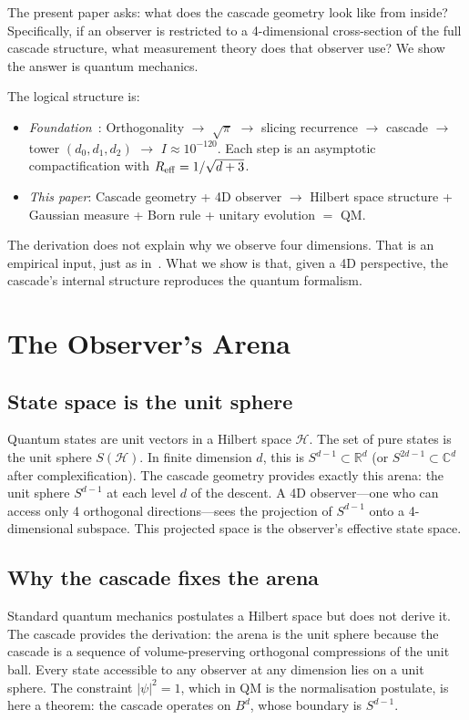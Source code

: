 \documentclass[12pt,a4paper]{article}
\begin{document}
The present paper asks: what does the cascade geometry look like from inside? Specifically,
if an observer is restricted to a 4-dimensional cross-section of the full cascade structure,
what measurement theory does that observer use? We show the answer is quantum mechanics.

The logical structure is:
\begin{itemize}
\item \emph{Foundation~\cite{paperI}}: Orthogonality $\to$ $\sqrt{\pi}$ $\to$ slicing
recurrence $\to$ cascade $\to$ tower $(d_0,d_1,d_2)$ $\to$ $I\approx 10^{-120}$. Each step
is an asymptotic compactification with $R_{\rm eff}=1/\sqrt{d+3}$.
\item \emph{This paper}: Cascade geometry + 4D observer $\to$ Hilbert space structure +
Gaussian measure + Born rule + unitary evolution $=$ QM.
\end{itemize}

The derivation does not explain why we observe four dimensions. That is an empirical input,
just as in~\cite{paperI}. What we show is that, given a 4D perspective, the cascade's
internal structure reproduces the quantum formalism.

\section{The Observer's Arena}

\subsection{State space is the unit sphere}

Quantum states are unit vectors in a Hilbert space $\mathcal{H}$. The set of pure states is
the unit sphere $S(\mathcal{H})$. In finite dimension $d$, this is $S^{d-1}\subset\mathbb{R}^d$
(or $S^{2d-1}\subset\mathbb{C}^d$ after complexification). The cascade geometry provides
exactly this arena: the unit sphere $S^{d-1}$ at each level $d$ of the descent. A 4D
observer---one who can access only 4 orthogonal directions---sees the projection of
$S^{d-1}$ onto a 4-dimensional subspace. This projected space is the observer's effective
state space.

\subsection{Why the cascade fixes the arena}

Standard quantum mechanics postulates a Hilbert space but does not derive it. The cascade
provides the derivation: the arena is the unit sphere because the cascade is a sequence of
volume-preserving orthogonal compressions of the unit ball. Every state accessible to any
observer at any dimension lies on a unit sphere. The constraint $|\psi|^2=1$, which in QM
is the normalisation postulate, is here a theorem: the cascade operates on $B^d$, whose
boundary is $S^{d-1}$.
\end{document}
